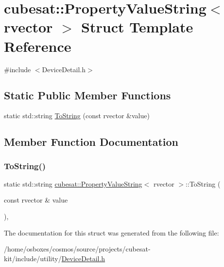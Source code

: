 \hypertarget{structcubesat_1_1PropertyValueString_3_01rvector_01_4}{}\section{cubesat\+:\+:Property\+Value\+String$<$ rvector $>$ Struct Template Reference}
\label{structcubesat_1_1PropertyValueString_3_01rvector_01_4}


{\ttfamily \#include $<$Device\+Detail.\+h$>$}

\subsection*{Static Public Member Functions}
\begin{DoxyCompactItemize}
\item 
static std\+::string \hyperlink{structcubesat_1_1PropertyValueString_3_01rvector_01_4_ab2b734fe8774345889887fe40dbf5b23}{To\+String} (const rvector \&value)
\end{DoxyCompactItemize}


\subsection{Member Function Documentation}
\mbox{\label{structcubesat_1_1PropertyValueString_3_01rvector_01_4_ab2b734fe8774345889887fe40dbf5b23}} 
\subsubsection{\texorpdfstring{To\+String()}{ToString()}}
{\footnotesize\ttfamily static std\+::string \hyperlink{structcubesat_1_1PropertyValueString}{cubesat\+::\+Property\+Value\+String}$<$ rvector $>$\+::To\+String (\begin{DoxyParamCaption}\item[{const rvector \&}]{value }\end{DoxyParamCaption})\hspace{0.3cm}{\ttfamily [inline]}, {\ttfamily [static]}}



The documentation for this struct was generated from the following file\+:\begin{DoxyCompactItemize}
\item 
/home/osboxes/cosmos/source/projects/cubesat-\/kit/include/utility/\hyperlink{DeviceDetail_8h}{Device\+Detail.\+h}\end{DoxyCompactItemize}
